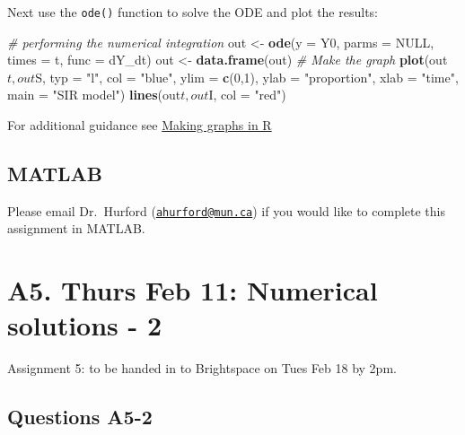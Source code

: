 \documentclass[]{book}
\newenvironment{Shaded}{\begin{snugshade}}{\end{snugshade}}
\newcommand{\KeywordTok}[1]{\textcolor[rgb]{0.13,0.29,0.53}{\textbf{{#1}}}}
\newcommand{\DataTypeTok}[1]{\textcolor[rgb]{0.13,0.29,0.53}{{#1}}}
\newcommand{\DecValTok}[1]{\textcolor[rgb]{0.00,0.00,0.81}{{#1}}}
\newcommand{\StringTok}[1]{\textcolor[rgb]{0.31,0.60,0.02}{{#1}}}
\newcommand{\CommentTok}[1]{\textcolor[rgb]{0.56,0.35,0.01}{\textit{{#1}}}}
\newcommand{\OtherTok}[1]{\textcolor[rgb]{0.56,0.35,0.01}{{#1}}}
\newcommand{\NormalTok}[1]{{#1}}
\begin{document}
Next use the \texttt{ode()} function to solve the ODE and plot the
results:

\begin{Shaded}
\begin{Highlighting}[]
\CommentTok{# performing the numerical integration}
\NormalTok{out <-}\StringTok{ }\KeywordTok{ode}\NormalTok{(}\DataTypeTok{y =} \NormalTok{Y0, }\DataTypeTok{parms =} \OtherTok{NULL}\NormalTok{, }\DataTypeTok{times =} \NormalTok{t, }\DataTypeTok{func =} \NormalTok{dY_dt)}
\NormalTok{out <-}\StringTok{ }\KeywordTok{data.frame}\NormalTok{(out)}
\CommentTok{# Make the graph}
\KeywordTok{plot}\NormalTok{(out$t, out$S, }\DataTypeTok{typ =} \StringTok{"l"}\NormalTok{, }\DataTypeTok{col =} \StringTok{"blue"}\NormalTok{, }\DataTypeTok{ylim =} \KeywordTok{c}\NormalTok{(}\DecValTok{0}\NormalTok{,}\DecValTok{1}\NormalTok{), }\DataTypeTok{ylab =} \StringTok{"proportion"}\NormalTok{, }\DataTypeTok{xlab =} \StringTok{"time"}\NormalTok{, }\DataTypeTok{main =} \StringTok{"SIR model"}\NormalTok{)}
\KeywordTok{lines}\NormalTok{(out$t, out$I, }\DataTypeTok{col =} \StringTok{"red"}\NormalTok{)}
\end{Highlighting}
\end{Shaded}

For additional guidance see
\href{https://ahurford.github.io/quant-guide-all-courses/graph.html}{Making
graphs in R}

\section{MATLAB}\label{matlab}

Please email Dr.~Hurford
(\href{mailto:ahurford@mun.ca}{\nolinkurl{ahurford@mun.ca}}) if you
would like to complete this assignment in MATLAB.

\chapter{A5. Thurs Feb 11: Numerical solutions -
2}\label{a5.-thurs-feb-11-numerical-solutions---2}

Assignment 5: to be handed in to Brightspace on Tues Feb 18 by 2pm.

\section{Questions A5-2}\label{questions-a5-2}
\end{document}
